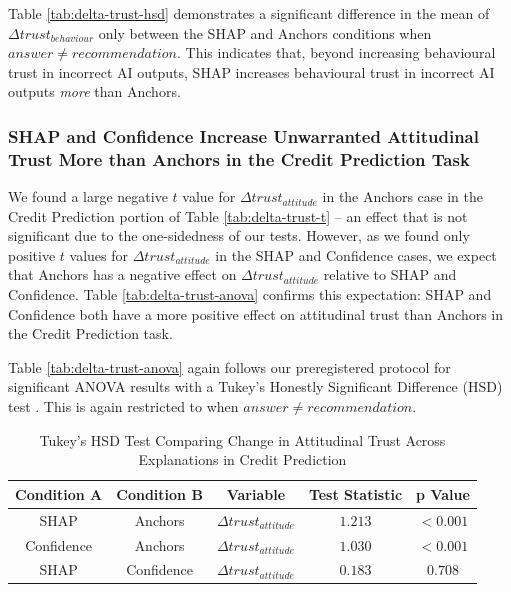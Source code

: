 Table \ref{tab:delta-trust-hsd} demonstrates a significant difference in the mean of $\Delta trust_{behaviour}$ only between the SHAP and Anchors conditions when $answer \neq recommendation$. This indicates that, beyond increasing behavioural trust in incorrect AI outputs, SHAP increases behavioural trust in incorrect AI outputs \emph{more} than Anchors.

\subsubsection{SHAP and Confidence Increase Unwarranted Attitudinal Trust More than Anchors in the Credit Prediction Task}\label{ssec:hsd-credit}
We found a large negative $t$ value for $\Delta trust_{attitude}$ in the Anchors case in the Credit Prediction portion of Table \ref{tab:delta-trust-t} -- an effect that is not significant due to the one-sidedness of our tests. However, as we found only positive $t$ values for $\Delta trust_{attitude}$ in the SHAP and Confidence cases, we expect that Anchors has a negative effect on $\Delta trust_{attitude}$ relative to SHAP and Confidence. Table \ref{tab:delta-trust-anova} confirms this expectation: SHAP and Confidence both have a more positive effect on attitudinal trust than Anchors in the Credit Prediction task.

Table \ref{tab:delta-trust-anova} again follows our preregistered protocol for significant ANOVA results with a Tukey's Honestly Significant Difference (HSD) test \cite{natarajan_binns_2022}. This is again restricted to when $answer \neq recommendation$.

\begin{table}[htbp]
    \caption{Tukey's HSD Test Comparing Change in Attitudinal Trust Across Explanations in Credit Prediction}
    \begin{center}
    \begin{tabular}{ccccc}
        \toprule
        Condition A & Condition B & Variable & Test Statistic & p Value \\
        \midrule
        SHAP & Anchors & $\Delta trust_{attitude}$ & $\mathbf{1.213}$ & $\mathbf{<0.001}$ \\
        Confidence & Anchors & $\Delta trust_{attitude}$ & $\mathbf{1.030}$ & $\mathbf{<0.001}$ \\
        SHAP & Confidence & $\Delta trust_{attitude}$ & $0.183$ & $0.708$ \\
        \bottomrule
    \end{tabular}
    \label{tab:delta-trust-hsd-2}
    \end{center}
\end{table}


